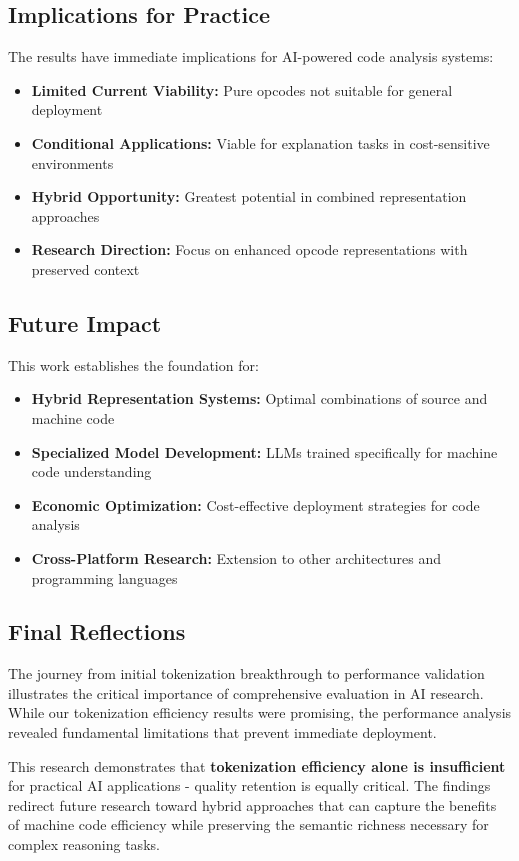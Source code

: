 \documentclass[11pt,a4paper]{article}
\begin{document}
\subsection{Implications for Practice}
The results have immediate implications for AI-powered code analysis systems:

\begin{itemize}
    \item \textbf{Limited Current Viability:} Pure opcodes not suitable for general deployment
    \item \textbf{Conditional Applications:} Viable for explanation tasks in cost-sensitive environments
    \item \textbf{Hybrid Opportunity:} Greatest potential in combined representation approaches
    \item \textbf{Research Direction:} Focus on enhanced opcode representations with preserved context
\end{itemize}

\subsection{Future Impact}
This work establishes the foundation for:
\begin{itemize}
    \item \textbf{Hybrid Representation Systems:} Optimal combinations of source and machine code
    \item \textbf{Specialized Model Development:} LLMs trained specifically for machine code understanding
    \item \textbf{Economic Optimization:} Cost-effective deployment strategies for code analysis
    \item \textbf{Cross-Platform Research:} Extension to other architectures and programming languages
\end{itemize}

\subsection{Final Reflections}
The journey from initial tokenization breakthrough to performance validation illustrates the critical importance of comprehensive evaluation in AI research. While our tokenization efficiency results were promising, the performance analysis revealed fundamental limitations that prevent immediate deployment.

This research demonstrates that \textbf{tokenization efficiency alone is insufficient} for practical AI applications - quality retention is equally critical. The findings redirect future research toward hybrid approaches that can capture the benefits of machine code efficiency while preserving the semantic richness necessary for complex reasoning tasks.
\end{document}
